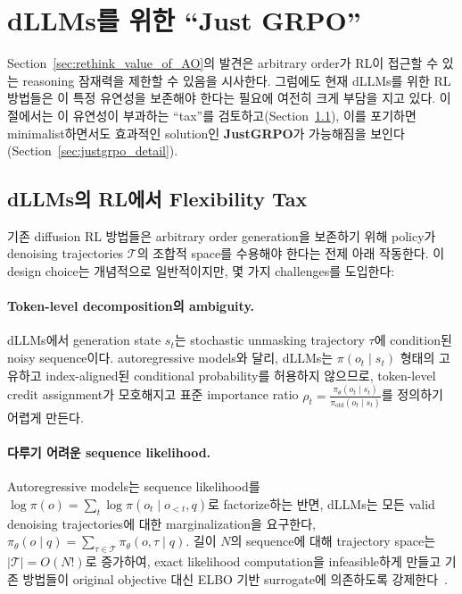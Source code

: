 \section{dLLMs를 위한 ``Just GRPO''}
\label{sec:justgrpo}

Section~\ref{sec:rethink_value_of_AO}의 발견은 arbitrary order가 RL이 접근할 수 있는 reasoning 잠재력을 제한할 수 있음을 시사한다. 그럼에도 현재 dLLMs를 위한 RL 방법들은 이 특정 유연성을 보존해야 한다는 필요에 여전히 크게 부담을 지고 있다.
이 절에서는 이 유연성이 부과하는 ``tax''를 검토하고(Section~\ref{sec:justgrpo_revisit}), 이를 포기하면 minimalist하면서도 효과적인 solution인 \textbf{JustGRPO}가 가능해짐을 보인다(Section~\ref{sec:justgrpo_detail}).

\subsection{dLLMs의 RL에서 Flexibility Tax}
\label{sec:justgrpo_revisit}
기존 diffusion RL 방법들은 arbitrary order generation을 보존하기 위해 policy가 denoising trajectories $\mathcal{T}$의 조합적 space를 수용해야 한다는 전제 아래 작동한다. 이 design choice는 개념적으로 일반적이지만, 몇 가지 challenges를 도입한다:

\paragraph{Token-level decomposition의 ambiguity.}
dLLMs에서 generation state $s_t$는 stochastic unmasking trajectory $\tau$에 condition된 noisy sequence이다.
autoregressive models와 달리, dLLMs는 $\pi(o_t \mid s_t)$ 형태의 고유하고 index-aligned된 conditional probability를 허용하지 않으므로, token-level credit assignment가 모호해지고 표준 importance ratio $\rho_t = \frac{\pi_\theta(o_t \mid s_t)}{\pi_{\text{old}}(o_t \mid s_t)}$를 정의하기 어렵게 만든다.

\paragraph{다루기 어려운 sequence likelihood.}
Autoregressive models는 sequence likelihood를 $\log \pi(o) = \sum_t \log \pi(o_t \mid o_{<t}, q)$로 factorize하는 반면, dLLMs는 모든 valid denoising trajectories에 대한 marginalization을 요구한다,
$\pi_\theta(o \mid q) = \sum_{\tau \in \mathcal{T}} \pi_\theta(o, \tau \mid q)$.
길이 $N$의 sequence에 대해 trajectory space는 $|\mathcal{T}| = O(N!)$로 증가하여, exact likelihood computation을 infeasible하게 만들고 기존 방법들이 original objective 대신 ELBO 기반 surrogate에 의존하도록 강제한다~\cite{wang2025spg,ou2025principled}.

